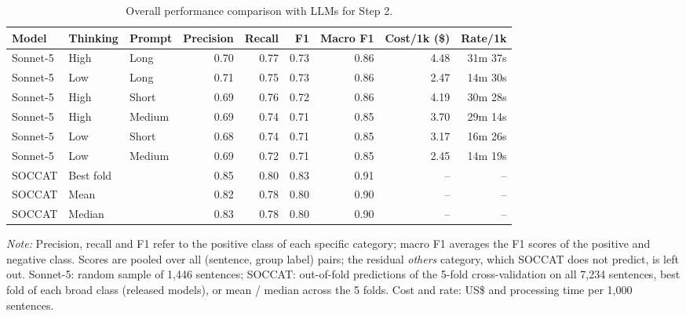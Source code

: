 \begin{table}[htb]
\centering
\begin{threeparttable}
\begin{tabular}{lllrrrrrr}
\toprule
Model & Thinking & Prompt & Precision & Recall & F1 & Macro F1 & Cost/1k (\$) & Rate/1k \\
\midrule
Sonnet-5 & High & Long & 0.70 & 0.77 & 0.73 & 0.86 & 4.48 & 31m 37s \\
Sonnet-5 & Low & Long & 0.71 & 0.75 & 0.73 & 0.86 & 2.47 & 14m 30s \\
Sonnet-5 & High & Short & 0.69 & 0.76 & 0.72 & 0.86 & 4.19 & 30m 28s \\
Sonnet-5 & High & Medium & 0.69 & 0.74 & 0.71 & 0.85 & 3.70 & 29m 14s \\
Sonnet-5 & Low & Short & 0.68 & 0.74 & 0.71 & 0.85 & 3.17 & 16m 26s \\
Sonnet-5 & Low & Medium & 0.69 & 0.72 & 0.71 & 0.85 & 2.45 & 14m 19s \\
\midrule
SOCCAT & \multicolumn{2}{l}{Best fold} & 0.85 & 0.80 & 0.83 & 0.91 & -- & -- \\
SOCCAT & \multicolumn{2}{l}{Mean} & 0.82 & 0.78 & 0.80 & 0.90 & -- & -- \\
SOCCAT & \multicolumn{2}{l}{Median} & 0.83 & 0.78 & 0.80 & 0.90 & -- & -- \\
\bottomrule
\end{tabular}
\begin{tablenotes}[flushleft]
\footnotesize
\item \textit{Note:} Precision, recall and F1 refer to the positive class of each specific category; macro F1 averages the F1 scores of the positive and negative class. Scores are pooled over all (sentence, group label) pairs; the residual \textit{others} category, which SOCCAT does not predict, is left out. Sonnet-5: random sample of 1,446 sentences; SOCCAT: out-of-fold predictions of the 5-fold cross-validation on all 7,234 sentences, best fold of each broad class (released models), or mean / median across the 5 folds. Cost and rate: US\$ and processing time per 1,000 sentences.
\end{tablenotes}
\end{threeparttable}
\caption{Overall performance comparison with LLMs for Step 2.}
\label{tab:llm-step2-summary}
\end{table}

